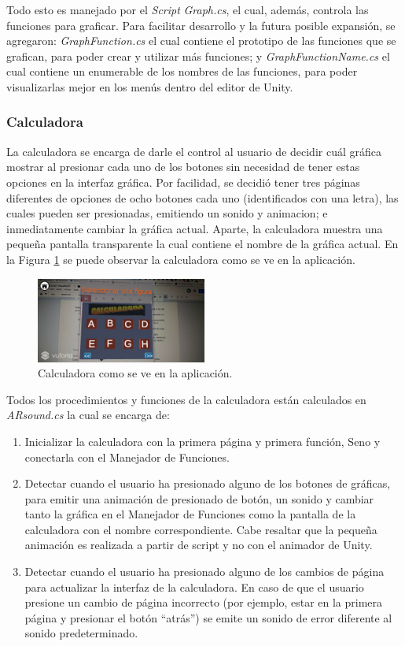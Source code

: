 Todo esto es manejado por el \textit{Script} \textit{Graph.cs}, el cual, además, controla las funciones para graficar. Para facilitar desarrollo y la futura posible expansión, se agregaron: \textit{GraphFunction.cs} el cual contiene el prototipo de las funciones que se grafican, para poder crear y utilizar más funciones; y \textit{GraphFunctionName.cs} el cual contiene un enumerable de los nombres de las funciones, para poder visualizarlas mejor en los menús dentro del editor de Unity.
\FloatBarrier

\subsubsection{Calculadora}
La calculadora se encarga de darle el control al usuario de decidir cuál gráfica mostrar al presionar cada uno de los botones sin necesidad de tener estas opciones en la interfaz gráfica. Por facilidad, se decidió tener tres páginas diferentes de opciones de ocho botones cada uno (identificados con una letra), las cuales pueden ser presionadas, emitiendo un sonido y animacion; e inmediatamente cambiar la gráfica actual. Aparte, la calculadora muestra una pequeña pantalla transparente la cual contiene el nombre de la gráfica actual. En la Figura \ref{fig:graf_calculadora} se puede observar la calculadora como se ve en la aplicación.

\begin{figure}[hbt!]
\centering
\includegraphics[width=0.5\textwidth]{figuras/graficas/calculadora.png}
\caption{\label{fig:graf_calculadora}Calculadora como se ve en la aplicación.}
\end{figure}

Todos los procedimientos y funciones de la calculadora están calculados en \textit{ARsound.cs} la cual se encarga de:
\begin{enumerate}
	\item Inicializar la calculadora con la primera página y primera función, Seno y conectarla con el Manejador de Funciones.
	\item Detectar cuando el usuario ha presionado alguno de los botones de gráficas, para emitir una animación de presionado de botón, un sonido y cambiar tanto la gráfica en el Manejador de Funciones como la pantalla de la calculadora con el nombre correspondiente. Cabe resaltar que la pequeña animación es realizada a partir de script y no con el animador de Unity.
	\item Detectar cuando el usuario ha presionado alguno de los cambios de página para actualizar la interfaz de la calculadora. En caso de que el usuario presione un cambio de página incorrecto (por ejemplo, estar en la primera página y presionar el botón “atrás”) se emite un sonido de error diferente al sonido predeterminado.
\end{enumerate}


